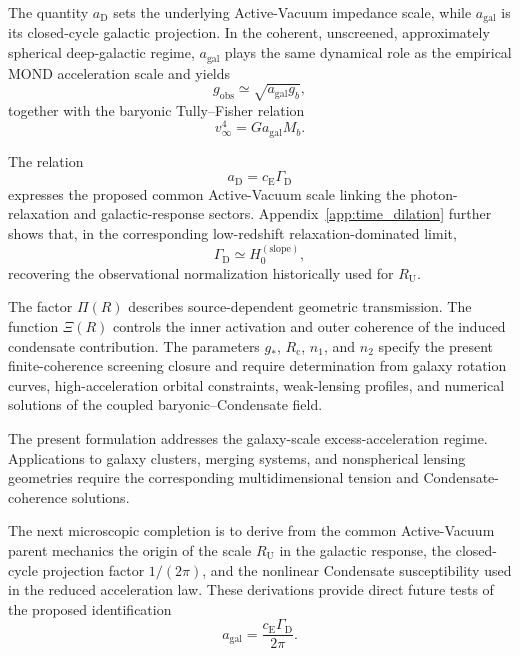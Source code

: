 The quantity $a_{\mathrm D}$ sets the underlying Active-Vacuum impedance scale,
while $a_{\mathrm{gal}}$ is its closed-cycle galactic projection. In the
coherent, unscreened, approximately spherical deep-galactic regime,
$a_{\mathrm{gal}}$ plays the same dynamical role as the empirical MOND
acceleration scale and yields
\begin{equation}
    g_{\mathrm{obs}}
    \simeq
    \sqrt{
        a_{\mathrm{gal}}g_b
    },
\end{equation}
together with the baryonic Tully--Fisher relation
\begin{equation}
    v_{\infty}^{4}
    =
    G
    a_{\mathrm{gal}}
    M_b.
\end{equation}

The relation
\begin{equation}
    a_{\mathrm D}
    =
    c_{\mathrm E}
    \Gamma_{\mathrm D}
\end{equation}
expresses the proposed common Active-Vacuum scale linking the photon-relaxation
and galactic-response sectors. Appendix~\ref{app:time_dilation} further shows
that, in the corresponding low-redshift relaxation-dominated limit,
\begin{equation}
    \Gamma_{\mathrm D}
    \simeq
    H_{0}^{(\mathrm{slope})},
\end{equation}
recovering the observational normalization historically used for
$R_{\mathrm U}$.

The factor $\Pi(R)$ describes source-dependent geometric transmission. The
function $\Xi(R)$ controls the inner activation and outer coherence of the
induced condensate contribution. The parameters $g_*$, $R_{\mathrm c}$,
$n_1$, and $n_2$ specify the present finite-coherence screening closure and
require determination from galaxy rotation curves, high-acceleration orbital
constraints, weak-lensing profiles, and numerical solutions of the coupled
baryonic--Condensate field.

The present formulation addresses the galaxy-scale excess-acceleration regime.
Applications to galaxy clusters, merging systems, and nonspherical lensing
geometries require the corresponding multidimensional tension and
Condensate-coherence solutions.

The next microscopic completion is to derive from the common Active-Vacuum
parent mechanics the origin of the scale $R_{\mathrm U}$ in the galactic
response, the closed-cycle projection factor $1/(2\pi)$, and the nonlinear
Condensate susceptibility used in the reduced acceleration law. These
derivations provide direct future tests of the proposed identification
\begin{equation}
    a_{\mathrm{gal}}
    =
    \frac{
        c_{\mathrm E}\Gamma_{\mathrm D}
    }{
        2\pi
    }.
\end{equation}